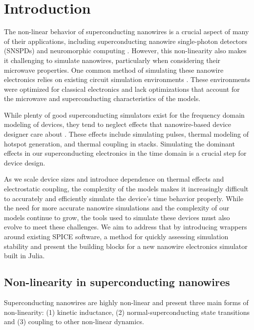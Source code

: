 \section{Introduction}

The non-linear behavior of superconducting nanowires is a crucial aspect of many of their applications, including superconducting nanowire single-photon detectors (SNSPDs) and neuromorphic computing \cite{snspd_original_paper, spiking_nn}. However, this non-linearity also makes it challenging to simulate nanowires, particularly when considering their microwave properties. One common method of simulating these nanowire electronics relies on existing circuit simulation environments \cite{karl_spice}. These environments were optimized for classical electronics and lack optimizations that account for the microwave and superconducting characteristics of the models.

While plenty of good superconducting simulators exist for the frequency domain
modeling of devices, they tend to neglect effects that nanowire-based device 
designer care about \cite{josephsoncircsjl, wrspice}. These effects include simulating pulses, thermal modeling
of hotspot generation, and thermal coupling in stacks.
Simulating the dominant effects in our superconducting electronics in the time domain
is a crucial step for device design.

As we scale device sizes and introduce dependence on thermal effects and electrostatic coupling, the complexity of the models makes it increasingly difficult to accurately and efficiently simulate the device's time behavior properly.
While the need for more accurate nanowire simulations and the complexity of our models continue to grow, the tools used to simulate these devices must also evolve to meet these challenges. We aim to address that
by introducing wrappers around existing SPICE software, a method for quickly
assessing simulation stability and present the building blocks for a new
nanowire electronics simulator built in Julia.

\subsection{Non-linearity in superconducting nanowires}\label{nonlinearity}

Superconducting nanowires are highly non-linear and present three main forms of non-linearity:
(1) kinetic inductance, (2) normal-superconducting state transitions and
(3) coupling to other non-linear dynamics.

